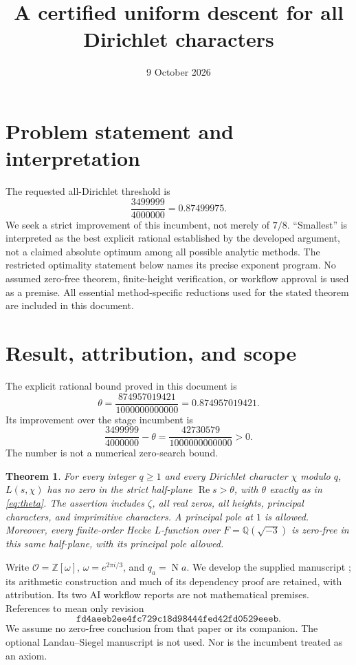 \documentclass[12pt]{article}
\title{A certified uniform descent for all Dirichlet characters}
\author{}
\date{9 October 2026}
\newtheorem{theorem}{Theorem}[section]
\newcommand{\Rea}{\operatorname{Re}}
\newcommand{\N}{\operatorname{N}}
\begin{document}
\maketitle

\section{Problem statement and interpretation}
The requested all-Dirichlet threshold is
\[
 \frac{3499999}{4000000}=0.87499975.
\]
We seek a strict improvement of this incumbent, not merely of \(7/8\).
``Smallest'' is interpreted as the best explicit rational established
by the developed argument, not a claimed absolute optimum among
all possible analytic methods.  The restricted optimality statement
below names its precise exponent program.  No assumed zero-free
theorem, finite-height verification, or workflow approval is used
as a premise.  All essential method-specific reductions used for the
stated theorem are included in this document.

\section{Result, attribution, and scope}\label{sec:result}
The explicit rational bound proved in this document is
\begin{equation}\label{eq:theta}
 \boxed{\theta=\frac{874957019421}{1000000000000}
                   =0.874957019421}.
\end{equation}
Its improvement over the stage incumbent is
\[
 \frac{3499999}{4000000}-\theta
       =\frac{42730579}{1000000000000}>0.
\]
The number is not a numerical zero-search bound.

\begin{theorem}\label{thm:main}
For every integer \(q\ge1\) and every Dirichlet character \(\chi\)
modulo \(q\), \(L(s,\chi)\) has no zero in the strict half-plane
\(\Rea s>\theta\), with \(\theta\) exactly as in \eqref{eq:theta}.
The assertion includes \(\zeta\), all real zeros, all heights,
principal characters, and imprimitive characters.  A principal
pole at \(1\) is allowed.  Moreover, every finite-order Hecke
\(L\)-function over \(F=\mathbb Q(\sqrt{-3})\) is zero-free in
this same half-plane, with its principal pole allowed.
\end{theorem}

Write \(\mathcal O=\mathbb Z[\omega]\), \(\omega=e^{2\pi i/3}\),
and \(q_a=\N a\).  We develop the supplied manuscript
\cite{Seed}; its arithmetic construction and much of its dependency
proof are retained, with attribution.  Its two AI workflow reports
are not mathematical premises.  References to \cite{QRH} mean
only revision
\[
 \texttt{fd4aeeb2ee4fc729c18d98444fed42fd0529eeeb}.
\]
We assume no zero-free conclusion from that paper or its companion.
The optional Landau--Siegel manuscript is not used.
Nor is the incumbent treated as an axiom.
\end{document}
